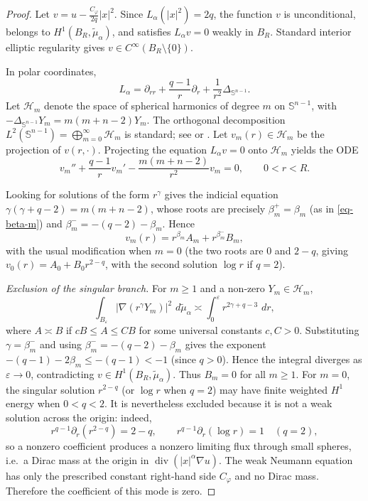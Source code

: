 \documentclass[12pt,leqno]{amsart}
\theoremstyle{plain} \newtheorem{thm}{Theorem}[section]
\theoremstyle{plain} \newtheorem{prop}[thm]{Proposition}
\theoremstyle{plain} \newtheorem{prob}[thm]{Problem}
\theoremstyle{definition} \newtheorem{defi}[thm]{Definition}
\theoremstyle{plain} \newtheorem{cor}[thm]{Corollary}
\theoremstyle{plain} \newtheorem{lem}[thm]{Lemma}
\theoremstyle{plain} \newtheorem{eg}{Example}[section]
\theoremstyle{remark} \newtheorem{rmk}[thm]{Remark}
\theoremstyle{plain} \newtheorem{conj}{Conjecture}
\numberwithin{equation}{section}
\newcommand{\cH}{\mathcal{H}}
\newcommand{\dd}{\,d}
\begin{document}
\begin{proof}
  Let $v=u-\frac{C_\varphi}{2q}|x|^2$. Since $L_\alpha(|x|^2)=2q$, the function $v$ is unconditional,
  belongs to $H^1(B_R,\tilde{\mu}_\alpha)$, and satisfies $L_\alpha v=0$
  weakly in $B_R$.  Standard interior elliptic regularity
  \cite[Chapters~6,8]{GT01} gives $v\in C^\infty(B_R\setminus\{0\})$.

  In polar coordinates,
  \[
    L_\alpha
    =\partial_{rr}+\frac{q-1}{r}\partial_r
     +\frac1{r^2}\Delta_{\mathbb{S}^{n-1}} .
  \]
  Let $\cH_m$ denote the space of spherical harmonics of degree $m$
  on $\mathbb{S}^{n-1}$, with $-\Delta_{\mathbb{S}^{n-1}}Y_m=m(m+n-2)Y_m$.  The
  orthogonal decomposition $L^2(\mathbb{S}^{n-1})=\bigoplus_{m=0}^\infty\cH_m$
  is standard; see \cite[Appendix]{Sch14} or
  \cite[Section~3]{Gro96}.  Let $v_m(r)\in\cH_m$ be the projection
  of $v(r,\cdot)$.  Projecting the equation $L_\alpha v=0$ onto
  $\cH_m$ yields the ODE
  \begin{equation}\label{eq-ode}
    v_m''+\frac{q-1}{r}v_m'
    -\frac{m(m+n-2)}{r^2}v_m=0,\qquad 0<r<R .
  \end{equation}

  Looking for solutions of the form $r^\gamma$ gives the indicial
  equation $\gamma(\gamma+q-2)=m(m+n-2)$, whose roots are
  precisely $\beta_m^+=\beta_m$ (as in \eqref{eq-beta-m}) and
  $\beta_m^-=-(q-2)-\beta_m$.  Hence
  \[
    v_m(r)=r^{\beta_m}A_m+r^{\beta_m^-}B_m,
  \]
  with the usual modification when $m=0$ (the two roots are $0$ and
  $2-q$, giving $v_0(r)=A_0+B_0 r^{2-q}$, with the second solution
  $\log r$ if $q=2$).

  \emph{Exclusion of the singular branch.}
  For $m\ge1$ and a non‑zero $Y_m\in\cH_m$,
  \[
    \int_{B_\varepsilon}|\nabla(r^\gamma Y_m)|^2\,\dd\tilde{\mu}_\alpha
    \asymp\int_0^\varepsilon r^{2\gamma+q-3}\,\dd r ,
  \]
  where $A\asymp B$ if $cB\le A\le CB$ for some universal constants $c,C>0$. Substituting $\gamma=\beta_m^-$ and using
  $\beta_m^-=-(q-2)-\beta_m$ gives the exponent
  $-(q-1)-2\beta_m\le-(q-1)<-1$ (since $q>0$).  Hence the integral diverges as $\varepsilon\to0$,
  contradicting $v\in H^1(B_R,\tilde{\mu}_\alpha)$.  Thus $B_m=0$ for all $m\ge1$.
  For $m=0$, the singular solution $r^{2-q}$ (or $\log r$ when $q=2$) may have finite weighted
  $H^1$ energy when $0<q<2$.  It is nevertheless excluded because it is not a weak
  solution across the origin: indeed,
  \[
    r^{q-1}\partial_r(r^{2-q})=2-q,\qquad
    r^{q-1}\partial_r(\log r)=1\quad(q=2),
  \]
  so a nonzero coefficient produces a nonzero limiting flux through small spheres,
  i.e.\ a Dirac mass at the origin in
  $\operatorname{div}(|x|^\alpha\nabla u)$.  The weak Neumann equation has only the
  prescribed constant right-hand side $C_\varphi$ and no Dirac mass.
  Therefore the coefficient of this mode is zero.


\end{proof}
\end{document}
